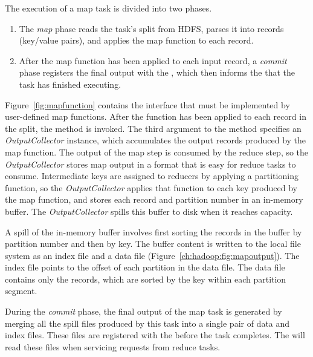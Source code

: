 The execution of a map task is divided into two phases.
\begin{enumerate}
    \ssp
\item
  The {\em map} phase reads the task's split from HDFS, parses it into
  records (key/value pairs), and applies the map function to each
  record.
\item
  After the map function has been applied to each input record, a
  {\em commit} phase registers the final output with the {\TT}, which
  then informs the {\JT} that the task has finished executing.
\end{enumerate}

Figure~\ref{fig:mapfunction} contains the interface that must be implemented by
user-defined map functions.  After the 
function has been applied to each record in the split, the  method is
invoked.  The third argument to the  method specifies an {\em
OutputCollector} instance, which accumulates the output records produced by the
map function.  The output of the map step is consumed by the reduce step, so
the {\em OutputCollector} stores map output in a format that is easy for reduce
tasks to consume.  Intermediate keys are assigned to reducers by applying a
partitioning function, so the {\em OutputCollector} applies that function to each key
produced by the map function, and stores each record and partition number in an
in-memory buffer.  The {\em OutputCollector} spills this buffer to disk when it
reaches capacity.

A spill of the in-memory buffer involves first sorting the records in the
buffer by partition number and then by key.  The buffer content is written to
the local file system as an index file and a data file
(Figure~\ref{ch:hadoop:fig:mapoutput}).  The index file points to the offset of
each partition in the data file.  The data file contains only the records,
which are sorted by the key within each partition segment.

During the {\em commit} phase, the final output of the map task is generated
by merging all the spill files produced by this task into a single pair of data
and index files.  These files are registered with the {\TT} before the task
completes.  The \TT will read these files when servicing requests from reduce
tasks.

